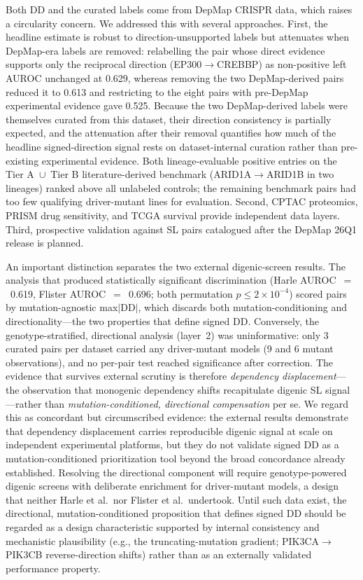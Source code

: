 \documentclass[11pt,a4paper]{article}
\begin{document}
Both DD and the curated labels come from DepMap CRISPR data, which raises a circularity concern. We addressed this with several approaches. First, the headline estimate is robust to direction-unsupported labels but attenuates when DepMap-era labels are removed: relabelling the pair whose direct evidence supports only the reciprocal direction (EP300$\rightarrow$CREBBP) as non-positive left AUROC unchanged at 0.629, whereas removing the two DepMap-derived pairs reduced it to 0.613 and restricting to the eight pairs with pre-DepMap experimental evidence gave 0.525. Because the two DepMap-derived labels were themselves curated from this dataset, their direction consistency is partially expected, and the attenuation after their removal quantifies how much of the headline signed-direction signal rests on dataset-internal curation rather than pre-existing experimental evidence. Both lineage-evaluable positive entries on the Tier A~$\cup$~Tier B literature-derived benchmark (ARID1A$\rightarrow$ARID1B in two lineages) ranked above all unlabeled controls; the remaining benchmark pairs had too few qualifying driver-mutant lines for evaluation. Second, CPTAC proteomics, PRISM drug sensitivity, and TCGA survival provide independent data layers. Third, prospective validation against SL pairs catalogued after the DepMap 26Q1 release is planned.

An important distinction separates the two external digenic-screen results. The analysis that produced statistically significant discrimination (Harle AUROC~$=$~0.619, Flister AUROC~$=$~0.696; both permutation $p \le 2\times10^{-4}$) scored pairs by mutation-agnostic max$|$DD$|$, which discards both mutation-conditioning and directionality—the two properties that define signed DD. Conversely, the genotype-stratified, directional analysis (layer~2) was uninformative: only 3 curated pairs per dataset carried any driver-mutant models (9 and 6 mutant observations), and no per-pair test reached significance after correction. The evidence that survives external scrutiny is therefore \textit{dependency displacement}—the observation that monogenic dependency shifts recapitulate digenic SL signal—rather than \textit{mutation-conditioned, directional compensation} per se. We regard this as concordant but circumscribed evidence: the external results demonstrate that dependency displacement carries reproducible digenic signal at scale on independent experimental platforms, but they do not validate signed DD as a mutation-conditioned prioritization tool beyond the broad concordance already established. Resolving the directional component will require genotype-powered digenic screens with deliberate enrichment for driver-mutant models, a design that neither Harle et al.\ nor Flister et al.\ undertook. Until such data exist, the directional, mutation-conditioned proposition that defines signed DD should be regarded as a design characteristic supported by internal consistency and mechanistic plausibility (e.g., the truncating-mutation gradient; PIK3CA$\rightarrow$PIK3CB reverse-direction shifts) rather than as an externally validated performance property.
\end{document}
